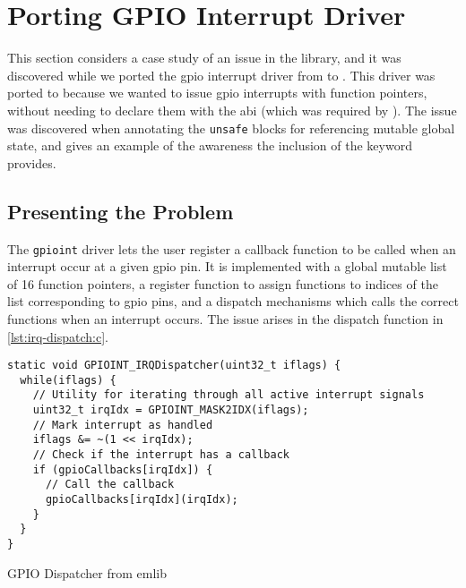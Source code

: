 
\section{Porting GPIO Interrupt Driver}
\label{sec:porting-gpioint}

This section considers a case study of an issue in the {\emdrv} library, and it was discovered while we ported the \gls{gpio} interrupt driver from {\C} to {\rust}.
This driver was ported to {\rust} because we wanted to issue \gls{gpio} interrupts with {\rust} function pointers, without needing to declare them with the {\C} \gls{abi} (which was required by {\emdrv}).
The issue was discovered when annotating the \texttt{unsafe} blocks for referencing mutable global state, and gives an example of the awareness the inclusion of the {\unsafe} keyword provides.

\subsection{Presenting the Problem}

The \texttt{gpioint} driver lets the user register a callback function to be called when an interrupt occur at a given \gls{gpio} pin.
It is implemented with a global mutable list of 16 function pointers, a register function to assign functions to indices of the list corresponding to \gls{gpio} pins, and a dispatch mechanisms which calls the correct functions when an interrupt occurs.
The issue arises in the dispatch function in \autoref{lst:irq-dispatch:c}.

\begin{listing}
  \begin{verbatim}
static void GPIOINT_IRQDispatcher(uint32_t iflags) {
  while(iflags) {
    // Utility for iterating through all active interrupt signals
    uint32_t irqIdx = GPIOINT_MASK2IDX(iflags);
    // Mark interrupt as handled
    iflags &= ~(1 << irqIdx);
    // Check if the interrupt has a callback
    if (gpioCallbacks[irqIdx]) {
      // Call the callback
      gpioCallbacks[irqIdx](irqIdx);
    }
  }
}
  \end{verbatim}
  \caption{GPIO Dispatcher from emlib}
  \label{lst:irq-dispatch:c}
\end{listing}

